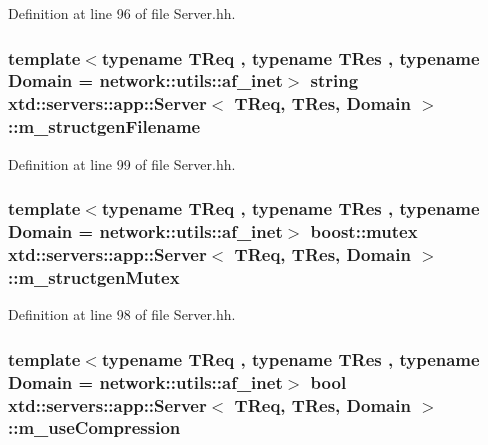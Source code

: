 Definition at line 96 of file Server.\-hh.

\hypertarget{classxtd_1_1servers_1_1app_1_1Server_a66a9242f7a55a296f1ca25cb18764eec}{
\subsubsection[{m\-\_\-structgen\-Filename}]{\setlength{\rightskip}{0pt plus 5cm}template$<$typename T\-Req , typename T\-Res , typename Domain  = network\-::utils\-::af\-\_\-inet$>$ string {\bf xtd\-::servers\-::app\-::\-Server}$<$ T\-Req, T\-Res, Domain $>$\-::m\-\_\-structgen\-Filename\hspace{0.3cm}{\ttfamily [protected]}}}\label{classxtd_1_1servers_1_1app_1_1Server_a66a9242f7a55a296f1ca25cb18764eec}


Definition at line 99 of file Server.\-hh.

\hypertarget{classxtd_1_1servers_1_1app_1_1Server_a3ad929be560e47d7193da946cd74e557}{
\subsubsection[{m\-\_\-structgen\-Mutex}]{\setlength{\rightskip}{0pt plus 5cm}template$<$typename T\-Req , typename T\-Res , typename Domain  = network\-::utils\-::af\-\_\-inet$>$ boost\-::mutex {\bf xtd\-::servers\-::app\-::\-Server}$<$ T\-Req, T\-Res, Domain $>$\-::m\-\_\-structgen\-Mutex\hspace{0.3cm}{\ttfamily [protected]}}}\label{classxtd_1_1servers_1_1app_1_1Server_a3ad929be560e47d7193da946cd74e557}


Definition at line 98 of file Server.\-hh.

\hypertarget{classxtd_1_1servers_1_1app_1_1Server_a143d0eeee15dd57ba4d03737a0128551}{
\subsubsection[{m\-\_\-use\-Compression}]{\setlength{\rightskip}{0pt plus 5cm}template$<$typename T\-Req , typename T\-Res , typename Domain  = network\-::utils\-::af\-\_\-inet$>$ bool {\bf xtd\-::servers\-::app\-::\-Server}$<$ T\-Req, T\-Res, Domain $>$\-::m\-\_\-use\-Compression\hspace{0.3cm}{\ttfamily [protected]}}}\label{classxtd_1_1servers_1_1app_1_1Server_a143d0eeee15dd57ba4d03737a0128551}


